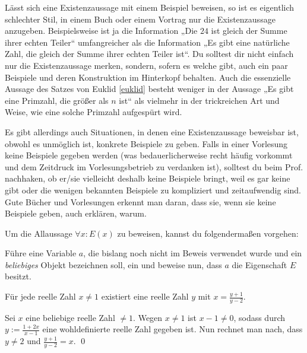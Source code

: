  
\begin{bem}
    Lässt sich eine Existenzaussage mit einem Beispiel beweisen, so ist es eigentlich schlechter Stil, in einem Buch oder einem Vortrag nur die Existenzaussage anzugeben. Beispielsweise ist ja die Information „Die $24$ ist gleich der Summe ihrer echten Teiler“ umfangreicher als die Information „Es gibt eine natürliche Zahl, die gleich der Summe ihrer echten Teiler ist“. Du solltest dir nicht einfach nur die Existenzaussage merken, sondern, sofern es welche gibt, auch ein paar Beispiele und deren Konstruktion im Hinterkopf behalten. Auch die essenzielle Aussage des Satzes von Euklid \cref{euklid} besteht weniger in der Aussage „Es gibt eine Primzahl, die größer als $n$ ist“ als vielmehr in der trickreichen Art und Weise, wie eine solche Primzahl aufgespürt wird.
    
    Es gibt allerdings auch Situationen, in denen eine Existenzaussage beweisbar ist, obwohl es unmöglich ist, konkrete Beispiele zu geben. Falls in einer Vorlesung keine Beispiele gegeben werden (was bedauerlicherweise recht häufig vorkommt und dem Zeitdruck im Vorlesungsbetrieb zu verdanken ist), solltest du beim Prof. nachhaken, ob er/sie vielleicht deshalb keine Beispiele bringt, weil es gar keine gibt oder die wenigen bekannten Beispiele zu kompliziert und zeitaufwendig sind. Gute Bücher und Vorlesungen erkennt man daran, dass sie, wenn sie keine Beispiele geben, auch erklären, warum.
\end{bem}


\begin{axiom}\label{allbeweis} 
    Um die Allaussage $\forall x: E(x)$ zu beweisen, kannst du folgendermaßen vorgehen:
    
    Führe eine Variable $a$, die bislang noch nicht im Beweis verwendet wurde und ein \emph{beliebiges} Objekt bezeichnen soll, ein und beweise nun, dass $a$ die Eigenschaft $E$ besitzt.
\end{axiom}


\begin{bsp} \label{bsp:allbeweis}
    Für jede reelle Zahl $x\neq 1$ existiert eine reelle Zahl $y$ mit $x=\frac{y+1}{y-2}$.
\end{bsp}


\begin{bew}
    Sei $x$ eine beliebige reelle Zahl $\neq 1$. Wegen $x\neq 1$ ist $x-1\neq 0$, sodass durch $y:= \frac{1+2x}{x-1}$ eine wohldefinierte reelle Zahl gegeben ist. Nun rechnet man nach, dass $y\neq 2$ und $\frac{y+1}{y-2}=x$. \qed
\end{bew}

